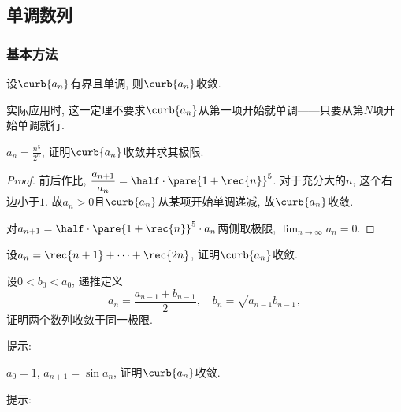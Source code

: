 \documentclass{ctexart}
\begin{document}


\subsection{单调数列} %
\label{sub:单调数列}

\subsubsection{基本方法} %
\label{ssub:基本方法}

\begin{theorem}[单调收敛定理]
    \label{thm:单调收敛定理}
    设$\curb{a_n}$有界且单调, 则$\curb{a_n}$收敛.
\end{theorem}
实际应用时, 这一定理不要求$\curb{a_n}$从第一项开始就单调——只要从第$N$项开始单调就行.
\begin{sample}
    \begin{ex}
        $\displaystyle a_n = \frac{n^5}{2^n}$, 证明$\curb{a_n}$收敛并求其极限.
    \end{ex}
    \begin{proof}
        前后作比, $\displaystyle \frac{a_{n+1}}{a_n} = \half \cdot\pare{1+\rec{n}}^5$. 对于充分大的$n$, 这个右边小于$1$. 故$a_n > 0$且$\curb{a_n}$从某项开始单调递减, 故$\curb{a_n}$收敛.
        \par
        对$\displaystyle {a_{n+1}} = \half \cdot\pare{1+\rec{n}}^5\cdot a_n$两侧取极限, $\displaystyle \lim_{n\rightarrow\infty}a_n = 0$.
    \end{proof}
\end{sample}
\begin{sample}
    \begin{ex}
        设$\displaystyle a_n = \rec{n+1} + \cdots + \rec{2n}$, 证明$\curb{a_n}$收敛.
    \end{ex}
\end{sample}
\begin{sample}
    \begin{ex}
        设$0<b_0<a_0$, 递推定义
        \[ a_n = \frac{a_{n-1} + b_{n-1}}{2},\quad b_n = \sqrt{a_{n-1}b_{n-1}}, \]
        证明两个数列收敛于同一极限.
    \end{ex}
    提示: 
\end{sample}
\begin{sample}
    \begin{ex}
        \label{ex:sin迭代收敛}
        $a_0=1$, $a_{n+1} = \sin a_n$, 证明$\curb{a_n}$收敛.
    \end{ex}
    提示: 
\end{sample}
\end{document}
